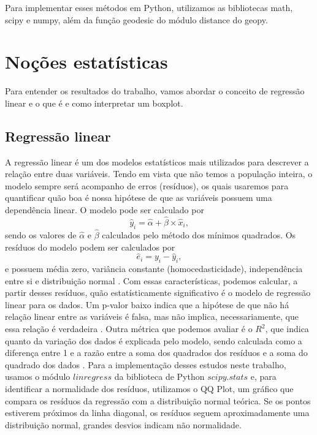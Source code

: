 Para implementar esses métodos em Python, utilizamos as bibliotecas math, scipy e numpy, além da função geodesic do módulo distance do geopy.


\section{Noções estatísticas}

Para entender os resultados do trabalho, vamos abordar o conceito de regressão linear e o que é e como interpretar um boxplot.

\subsection{Regressão linear}

A regressão linear é um dos modelos estatísticos mais utilizados para descrever a relação entre duas variáveis. Tendo em vista que não temos a população inteira, o modelo sempre será acompanho de erros (resíduos), os quais usaremos para quantificar quão boa é nossa hipótese de que as variáveis possuem uma dependência linear. O modelo pode ser calculado por 
\begin{equation*}
\hat{y}_i = \hat{\alpha} + \hat{\beta}\times\hat{x}_{i},
\end{equation*} sendo os valores de $\hat{\alpha}$ e $\hat{\beta}$ calculados pelo método dos mínimos quadrados. Os resíduos do modelo podem ser calculados por 
\begin{equation*}
\hat{e}_i = y_i - \hat{y}_{i},
\end{equation*} e possuem média zero, variância constante (homocedasticidade), independência entre si e distribuição normal \citep{MorettinSinger2019}. Com essas características, podemos calcular, a partir desses resíduos, quão estatísticamente significativo é o modelo de regressão linear para os dados. Um p-valor baixo indica que a hipótese de que não há relação linear entre as variáveis é falsa, mas não implica, necessariamente, que essa relação é verdadeira \citep{pvalue}. Outra métrica que podemos avaliar é o $R^2$, que indica quanto da variação dos dados é explicada pelo modelo, sendo calculada como a diferença entre 1 e a razão entre a soma dos quadrados dos resíduos e a soma do quadrado dos dados \citep{MorettinSinger2019}. Para a implementação desses estudos neste trabalho, usamos o módulo $linregress$ da biblioteca de Python $scipy.stats$ e, para identificar a normalidade dos resíduos, utilizamos o QQ Plot, um gráfico que compara os resíduos da regressão com a distribuição normal teórica. Se os pontos estiverem próximos da linha diagonal, os resíduos seguem aproximadamente uma distribuição normal, grandes desvios indicam não normalidade.

